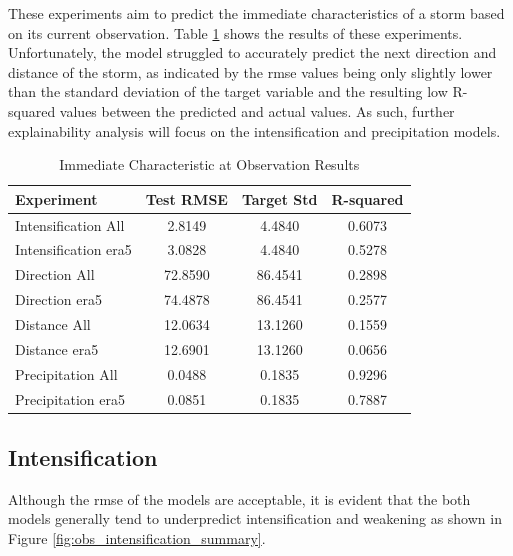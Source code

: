 These experiments aim to predict the immediate characteristics of a storm based on its current observation. Table \ref{tab:obs_experiment_results} shows the results of these experiments. Unfortunately, the model struggled to accurately predict the next direction and distance of the storm, as indicated by the \acrshort{rmse} values being only slightly lower than the standard deviation of the target variable and the resulting low R-squared values between the predicted and actual values. As such, further explainability analysis will focus on the intensification and precipitation models.

\begin{table}[h!]
\centering
\caption{Immediate Characteristic at Observation Results}
\label{tab:obs_experiment_results}
\begin{tabular}{lccc}
\hline
\textbf{Experiment} & \textbf{Test RMSE} & \textbf{Target Std} & \textbf{R-squared} \\
\hline
Intensification All     & 2.8149  & 4.4840  & 0.6073 \\
Intensification \acrshort{era5}    & 3.0828  & 4.4840  & 0.5278 \\
Direction All     & 72.8590 & 86.4541 & 0.2898 \\
Direction \acrshort{era5}     & 74.4878 & 86.4541 & 0.2577 \\
Distance All      & 12.0634 & 13.1260 & 0.1559 \\
Distance \acrshort{era5}     & 12.6901 & 13.1260 & 0.0656 \\
Precipitation All       & 0.0488  & 0.1835  & 0.9296 \\
Precipitation \acrshort{era5}      & 0.0851  & 0.1835  & 0.7887 \\
\hline
\end{tabular}
\end{table}

\clearpage
\subsection{Intensification}

Although the \acrshort{rmse} of the models are acceptable, it is evident that the both models generally tend to underpredict intensification and weakening as shown in Figure \ref{fig:obs_intensification_summary}.


